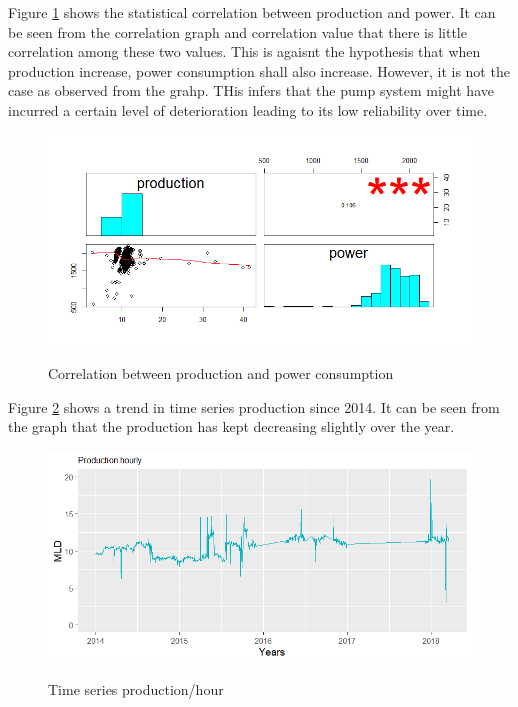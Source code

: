 Figure \ref{ch05_fig_energy_correlation} shows the statistical correlation between production and power. It can be seen from the correlation graph and correlation value that there is little correlation among these two values. This is agaisnt the  hypothesis that when production increase, power consumption shall also increase. However, it is not the case as observed from the grahp. THis infers that the pump system might have incurred a certain level of deterioration leading to its low reliability over time. 

\begin{figure}[!htb]
	\includegraphics[scale=0.5]{figures/ch05_fig_energy_correlation} \\
	\caption{Correlation between production and power consumption}
	\label{ch05_fig_energy_correlation} 
\end{figure}

Figure \ref{ch05_fig_energy_production} shows a trend in time series production since 2014. It can be seen from the graph that the production has kept decreasing slightly over the year. 

\begin{figure}[!htb]
	\includegraphics[scale=0.5]{figures/ch05_fig_energy_production} \\
	\caption{Time series production/hour}
	\label{ch05_fig_energy_production} 
\end{figure}

